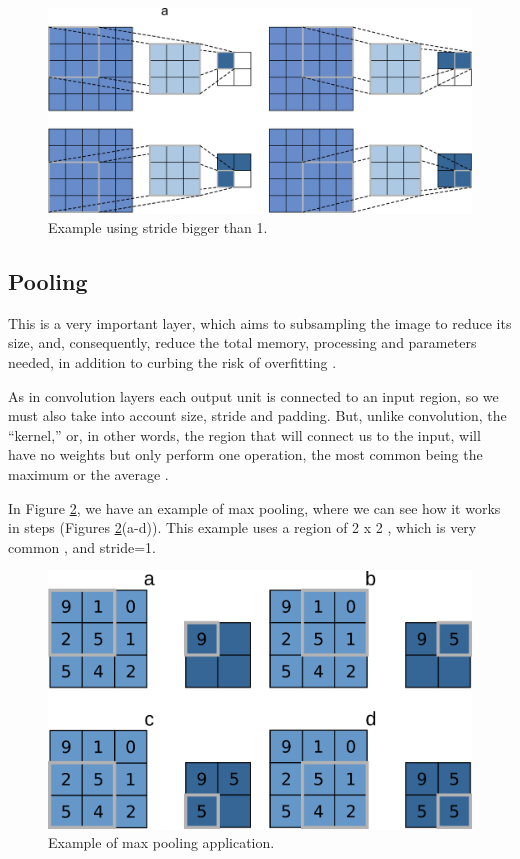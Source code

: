 \begin{figure}
    \centering
    \includegraphics[scale=0.20]{"Part 3 - Learning Systems/Supervised Learning/Deep Learning/images/stride.png"}
    \caption{Example using stride bigger than 1.}
    \label{fig:stride}
\end{figure}

\subsection{Pooling}

This is a very important layer, which aims to subsampling the image to reduce its size, and, consequently, reduce the total memory, processing and parameters needed, in addition to curbing the risk of overfitting \cite{geron2019}\cite{adrian2017}\cite{elgendy2020}.

As in convolution layers each output unit is connected to an input region, so we must also take into account size, stride and padding. But, unlike convolution, the “kernel,” or, in other words, the region that will connect us to the input, will have no weights but only perform one operation, the most common being the maximum or the average \cite{geron2019} .

In Figure \ref{fig:figure121}, we have an example of max pooling, where we can see how it works in steps (Figures \ref{fig:figure121}(a-d)). This example uses a region of 2 x 2 , which is very common \cite{adrian2017}, and stride=1.

\begin{figure}
    \centering
    \includegraphics[scale=0.30]{"Part 3 - Learning Systems/Supervised Learning/Deep Learning/images/figure121.png"}
    \caption{Example of max pooling application.}
    \label{fig:figure121}
\end{figure}

